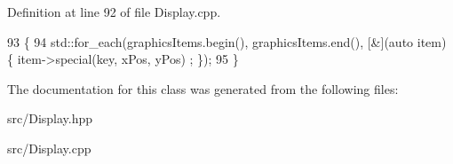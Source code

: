 Definition at line 92 of file Display.\+cpp.


\begin{DoxyCode}
93 \{
94   std::for\_each(graphicsItems.begin(), graphicsItems.end(), [&](\textcolor{keyword}{auto} item) \{ item->special(key, xPos, yPos)
      ; \});
95 \}
\end{DoxyCode}


The documentation for this class was generated from the following files\+:\begin{DoxyCompactItemize}
\item 
src/Display.\+hpp\item 
src/Display.\+cpp\end{DoxyCompactItemize}
